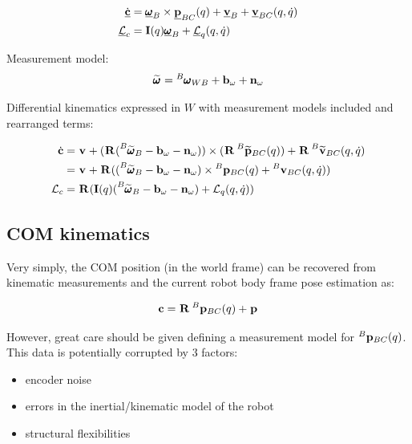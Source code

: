 \documentclass[11pt]{article}
\newcommand{\Rot}[2]{\prescript{#1}{}{\bfR}_{#2}}
\newcommand{\noise}{\bfn}
\newcommand{\posiv}[1]{\underline{\bfp}_{#1}}
\newcommand{\posi}[2]{\prescript{#1}{}{\bfp}_{#2}}
\newcommand{\posim}[2]{\prescript{#1}{}{\widetilde{\bfp}}_{#2}}
\newcommand{\velv}[1]{\underline{\bfv}_{#1}}
\newcommand{\vel}[2]{\prescript{#1}{}{\bfv}_{#2}}
\newcommand{\velm}[2]{\prescript{#1}{}{\widetilde{\bfv}}_{#2}}
\newcommand{\angvelv}[1]{\underline{\pmb{\omega}}_{#1}}
\newcommand{\angvel}[2]{\prescript{#1}{}{\pmb{\omega}}_{#2}}
\newcommand{\angvelm}[2]{\prescript{#1}{}{\widetilde{\pmb{\omega}}}_{#2}}
\newcommand{\AM}{\mathcal{L}}
\newcommand{\AMv}{\underline{\mathcal{L}}}
\newcommand{\COM}{\bfc}
\newcommand{\COMv}{\underline{\bfc}}
\begin{document}
\begin{equation}
\begin{split}
\dot{\COMv} &= \angvelv{B} \times \posiv{BC}(q) + \velv{B} + \velv{BC}(q,\dot{q}) 
\\
\AMv_c &= \bfI(q) \angvelv{B} + \AMv_q (q,\dot{q})   
\end{split}
\end{equation}

Measurement model:
\begin{align}
    \angvelm{}{} = \angvel{B}{WB} + \bfb_{\omega} + \noise_{\omega}
\end{align}

Differential kinematics expressed in $W$ with measurement models included and rearranged terms:

\begin{equation}
\begin{split}
\dot{\COM} &= \vel{}{} + (\Rot{}{}(\angvelm{B}{B} - \bfb_{\omega} - \noise_{\omega})) \times (\Rot{}{}\posim{B}{BC}(q)) + \Rot{}{}\velm{B}{BC}(q,\dot{q}) 
\\
&= \vel{}{} + \Rot{}{}((\angvelm{B}{B} - \bfb_{\omega} - \noise_{\omega}) \times \posi{B}{BC}(q) + \vel{B}{BC}(q,\dot{q}))
\\
\AM_c &= \Rot{}{}(\bfI(q) (\angvelm{B}{B} - \bfb_{\omega} - \noise_{\omega}) + \AM_q (q,\dot{q}))
\end{split}
\end{equation}

\subsection{COM kinematics}
Very simply, the COM position (in the world frame) can be recovered from kinematic measurements and the current robot body frame pose estimation as:

\begin{equation}
    \COM = \Rot{}{} \posi{B}{BC}(q) + \posi{}{}
\end{equation}

However, great care should be given defining a measurement model for \(\posi{B}{BC}(q)\). This data is potentially corrupted by 3 factors:
\begin{itemize}
    \item encoder noise
    \item errors in the inertial/kinematic model of the robot
    \item structural flexibilities
\end{itemize}
\end{document}
